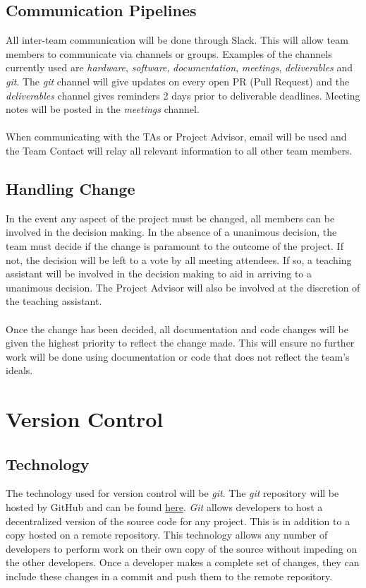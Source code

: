 \documentclass[11pt]{article}
\begin{document}
\subsection{Communication Pipelines}
All inter-team communication will be done through Slack. This will allow team members to communicate via channels or groups. Examples of the channels currently used are \textit{hardware}, \textit{software}, \textit{documentation}, \textit{meetings}, \textit{deliverables} and \textit{git}. The \textit{git} channel will give updates on every open PR (Pull Request) and the \textit{deliverables} channel gives reminders 2 days prior to deliverable deadlines. Meeting notes will be posted in the \textit{meetings} channel. \\ \\
When communicating with the TAs or Project Advisor, email will be used and the Team Contact will relay all relevant information to all other team members.
\subsection{Handling Change}
In the event any aspect of the project must be changed, all members can be involved in the decision making. In the absence of a unanimous decision, the team must decide if the change is paramount to the outcome of the project. If not, the decision will be left to a vote by all meeting attendees. If so, a teaching assistant will be involved in the decision making to aid in arriving to a unanimous decision. The Project Advisor will also be involved at the discretion of the teaching assistant. \\ \\
Once the change has been decided, all documentation and code changes will be given the highest priority to reflect the change made. This will ensure no further work will be done using documentation or code that does not reflect the team's ideals.
\section{Version Control}
\subsection{Technology}
The technology used for version control will be \textit{git}. The \textit{git} repository will be hosted by GitHub and can be found \href{https://github.com/ChristopherMcDonald/SoftwareTronCapstone}{here}. \textit{Git} allows developers to host a decentralized version of the source code for any project. This is in addition to a copy hosted on a remote repository. This technology allows any number of developers to perform work on their own copy of the source without impeding on the other developers. Once a developer makes a complete set of changes, they can include these changes in a commit and push them to the remote repository.
\end{document}
